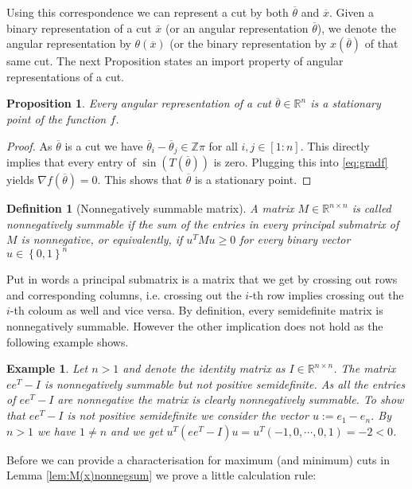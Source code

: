 \documentclass[12pt,a4paper]{article}
\theoremstyle{mythm}
\newtheorem{Def}[thm]{Definition}
\newtheorem{prop}[thm]{Proposition}
\newtheorem*{exa}{Example}
\begin{document}
Using this correspondence we can represent a cut by both $ \overline{ \theta }  $ and $ \overline{ x }  $. Given a binary representation of a cut $ \overline{ x }  $ (or an
angular representation $ \overline{ \theta }  $), we denote the angular representation by $ \theta ( \overline{ x } ) $ 
(or the binary representation by $ x ( \overline{ \theta } ) $ of that same cut.
The next Proposition states an import property of angular representations of a cut.
\begin{prop}
\label{prop:cutsArestationaryPoints} 
Every angular representation of a cut $ \overline{ \theta } \in \mathbb{R} ^{ n }  $ is a stationary point of the function $ f $.
\end{prop} 
\begin{proof}
As $ \overline{ \theta } $ is a cut we have $ \overline{ \theta } _{ i } - \overline{ \theta } _{ j } \in \mathbb{Z} \pi  $ for all $ i,j \in \left[ 1:n \right]  $. 
This directly implies that every entry of $ \sin( T ( \overline{ \theta } ) )  $ is zero. Plugging this into \ref{eq:gradf} yields $ \nabla f ( \overline{ \theta } ) = 0$.
This shows that $ \overline{ \theta }  $ is a stationary point.
\end{proof}
\begin{Def}[Nonnegatively summable matrix]
A matrix $ M \in \mathbb{R} ^{ n \times n }  $ is called nonnegatively summable if the sum of the entries in every principal submatrix of $ M $ is nonnegative, or
equivalently, if $ u ^{ T} M u \geq 0    $ for every binary vector $ u \in \left\{ 0,1 \right\} ^{ n }  $ 
\end{Def} 
Put in words a principal submatrix is a matrix that we get by crossing out rows and corresponding columns, i.e. crossing out the $ i$-th row implies crossing out the $ i
$-th coloum as well and vice versa.
By definition, every semidefinite matrix is nonnegatively summable. However the other implication does not hold as the following example shows.
\begin{exa}
Let $ n>1 $ and denote the identity matrix as $ I \in \mathbb{R} ^{ n \times n }  $.
The matrix $ ee^T - I $ is nonnegatively summable but not positive semidefinite.
As all the entries of $ ee^T - I $ are nonnegative the matrix is clearly nonnegatively summable.
To show that $ ee^T - I $ is not positive semidefinite we consider the vector $ u := e_1 - e_n $. By $ n>1  $ we have $ 1 \neq n  $ and we get 
$ u ^T \left( ee^T - I \right) u = u^T \left( -1,0, \cdots, 0,1 \right) = -2 < 0  $.
\end{exa} 
Before we can provide a characterisation for maximum (and minimum) cuts in Lemma \ref{lem:M(x)nonnegsum} we prove a little calculation rule:
\end{document}
